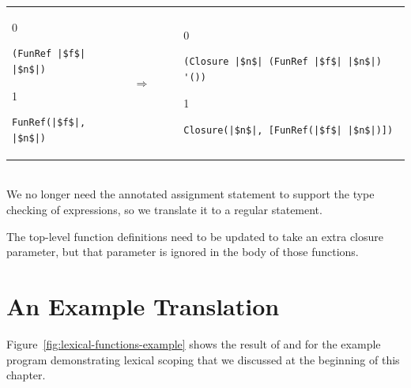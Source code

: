 \documentclass[7x10]{TimesAPriori_MIT}%
\def\racketEd{0}
\def\pythonEd{1}
\def\edition{1}
\newcommand{\pythonColor}[0]{}
\numberwithin{theorem}{chapter}
\numberwithin{definition}{chapter}
\numberwithin{equation}{chapter}
\begin{document}
\begin{tabular}{lll}
\begin{minipage}{0.2\textwidth}
{\if\edition\racketEd
\begin{lstlisting}
(FunRef |$f$| |$n$|)
\end{lstlisting}
\fi}
{\if\edition\pythonEd\pythonColor
\begin{lstlisting}
FunRef(|$f$|, |$n$|)
\end{lstlisting}
\fi}
\end{minipage}
&
$\Rightarrow\qquad$
&
\begin{minipage}{0.5\textwidth}
{\if\edition\racketEd
\begin{lstlisting}
(Closure |$n$| (FunRef |$f$| |$n$|) '())
\end{lstlisting}
\fi}
{\if\edition\pythonEd\pythonColor
\begin{lstlisting}
Closure(|$n$|, [FunRef(|$f$| |$n$|)])
\end{lstlisting}
\fi}
\end{minipage}
\end{tabular}  \\


We no longer need the annotated assignment statement 
to support the type checking of  expressions, so we
translate it to a regular  statement.

The top-level function definitions need to be updated to take an extra
closure parameter, but that parameter is ignored in the body of those
functions.

\section{An Example Translation}
\label{sec:example-lambda}

Figure~\ref{fig:lexical-functions-example} shows the result of
 and  for the example
program demonstrating lexical scoping that we discussed at the
beginning of this chapter.
\end{document}
